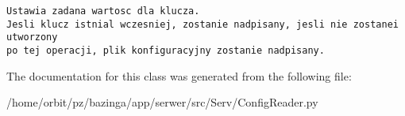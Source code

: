 \footnotesize\begin{verbatim}Ustawia zadana wartosc dla klucza.
Jesli klucz istnial wczesniej, zostanie nadpisany, jesli nie zostanei utworzony
po tej operacji, plik konfiguracyjny zostanie nadpisany.        
\end{verbatim}
\normalsize
 

The documentation for this class was generated from the following file:\begin{CompactItemize}
\item 
/home/orbit/pz/bazinga/app/serwer/src/Serv/ConfigReader.py\end{CompactItemize}
